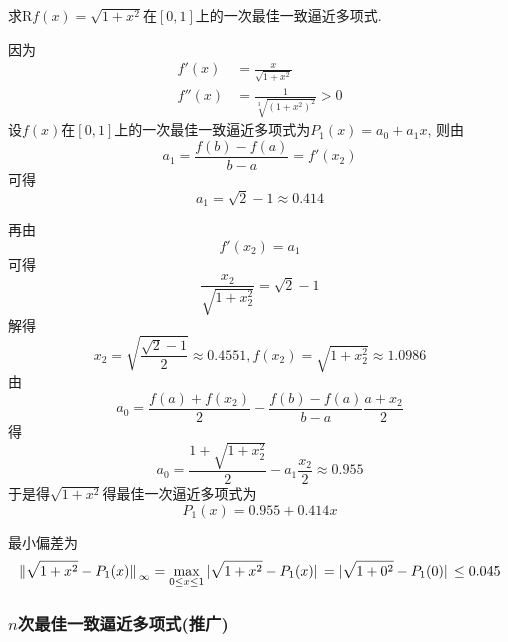\begin{example}
    求R$f(x)=\sqrt{1+x^2}$在$[0,1]$上的一次最佳一致逼近多项式.
\end{example}
\begin{solution}
    因为
    \begin{align*}
        f'(x)&=\frac{x}{\sqrt{1+x^2}}\\
        f''(x)&=\frac{1}{\sqrt[3]{(1+x^2)^2}}>0
    \end{align*}
    设$f(x)$在$[0,1]$上的一次最佳一致逼近多项式为$P_1(x)=a_0+a_1x$, 则由
    \begin{equation*}
        a_1=\frac{f(b)-f(a)}{b-a}=f'(x_2)
    \end{equation*}
    可得
    \begin{equation*}
        a_1=\sqrt{2}-1\approx0.414
    \end{equation*}

    再由
    \begin{equation*}
        f'(x_2)=a_1
    \end{equation*}
    可得
    \begin{equation*}
        \frac{x_2}{\sqrt{1+x_2^2}}=\sqrt{2}-1
    \end{equation*}
    解得
    \begin{equation*}
        x_2=\sqrt{\frac{\sqrt{2}-1}{2}}\approx0.4551, f(x_2)=\sqrt{1+x_2^2}\approx1.0986
    \end{equation*}
    由
    \begin{equation*}
        a_0=\frac{f(a)+f(x_2)}{2}-\frac{f(b)-f(a)}{b-a}\frac{a+x_2}{2}
    \end{equation*}
    得
    \begin{equation*}
        a_0=\frac{1+\sqrt{1+x_2^2}}{2}-a_1\frac{x_2}{2}\approx0.955
    \end{equation*}
    于是得$\sqrt{1+x^2}$得最佳一次逼近多项式为
    \begin{equation*}
        P_1(x)=0.955+0.414x
    \end{equation*}

    最小偏差为
    \begin{equation*}
        \norm*{\sqrt{1+x^2}-P_1(x)}_\infty=\max_{0\le x\le1}\abs*{\sqrt{1+x^2}-P_1(x)}=\abs*{\sqrt{1+0^2}-P_1(0)}\le0.045
    \end{equation*}
\end{solution}

\subsubsection{$n$次最佳一致逼近多项式(推广)}

